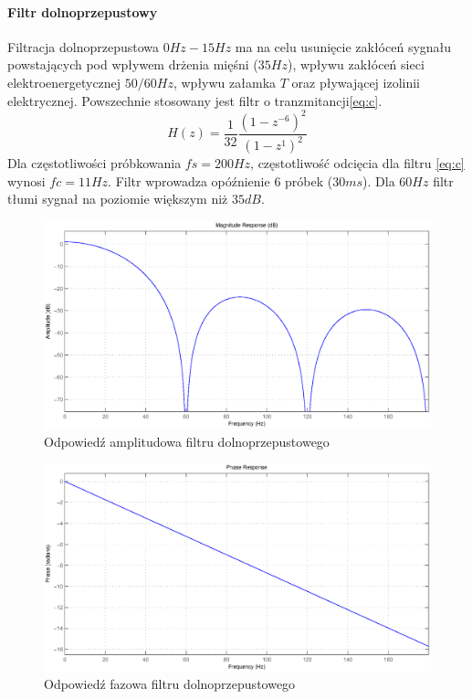 \documentclass[a4paper, 11pt]{article}
\begin{document}
\paragraph{Filtr dolnoprzepustowy}
Filtracja dolnoprzepustowa $0Hz - 15Hz$ ma na celu usunięcie zakłóceń sygnału powstających
pod wpływem drżenia mięśni ($35 Hz$), wpływu
zakłóceń sieci elektroenergetycznej $50/60 Hz$, wpływu załamka $T$ oraz pływającej izolinii
elektrycznej. Powszechnie stosowany jest filtr o tranzmitancji\eqref{eq:c}.
\begin{equation}
H(z) = \frac{1}{32} \frac{(1-z^{-6})^2}{(1-z^1)^2}\label{eq:c}
\end{equation}
\indent Dla częstotliwości próbkowania $fs = 200 Hz$, częstotliwość odcięcia
 dla filtru \eqref{eq:c} wynosi $fc = 11 Hz$. Filtr wprowadza opóźnienie $6$ próbek ($30 ms$). Dla $60 Hz$ filtr
tłumi sygnał na poziomie większym niż $35 dB$.
\begin{figure}[h]
\centering
\includegraphics[scale=0.5]{include/lowpassampres.eps}
\caption{Odpowiedź amplitudowa filtru dolnoprzepustowego}
\label{lowpassampres}
\end{figure}
\begin{figure}[htl]
\centering
\includegraphics[scale=0.5]{include/lowpassphaseres.eps}
\caption{Odpowiedź fazowa filtru dolnoprzepustowego}
\label{lowpassphaseres}
\end{figure}
\end{document}
